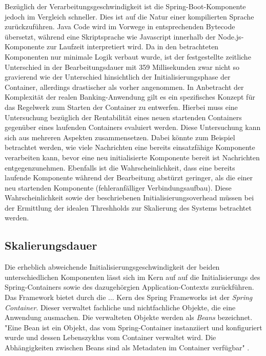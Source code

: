 Bezüglich der Verarbeitungsgeschwindigkeit ist die Spring-Boot-Komponente jedoch im Vergleich schneller. Dies ist auf die Natur einer kompilierten Sprache zurückzuführen. Java Code wird im Vorwege in entsprechenden Bytecode übersetzt, während eine Skriptsprache wie Javascript innerhalb der Node.js-Komponente zur Laufzeit interpretiert wird. Da in den betrachteten Komponenten nur minimale Logik verbaut wurde, ist der festgestellte zeitliche Unterschied in der Bearbeitungsdauer mit 359  Millisekunden zwar nicht so gravierend wie der Unterschied hinsichtlich der Initialisierungsphase der Container, allerdings drastischer als vorher angenommen. In Anbetracht der Komplexität der realen Banking-Anwendung gilt es ein spezifisches Konzept für das Regelwerk zum Starten der Container zu entwerfen. Hierbei muss eine Untersuchung bezüglich der Rentabilität eines neuen startenden Containers gegenüber eines laufenden Containers evaluiert werden. Diese Untersuchung kann sich aus mehreren Aspekten zusammensetzen. Dabei könnte zum Beispiel betrachtet werden, wie viele Nachrichten eine bereits einsatzfähige Komponente verarbeiten kann, bevor eine neu initialisierte Komponente bereit ist Nachrichten entgegenzunehmen. Ebenfalls ist die Wahrscheinlichkeit, dass eine bereits laufende Komponente während der Bearbeitung abstürzt geringer, als die einer neu startenden Komponente (fehleranfälliger Verbindungsaufbau). Diese Wahrscheinlichkeit sowie der beschriebenen Initialisierungsoverhead müssen bei der Ermittlung der idealen Threshholds zur Skalierung des Systems betrachtet werden. 


\subsection{Skalierungsdauer}
\label{ss:skalierungsdauer}
Die erheblich abweichende Initialisierungsgeschwindigkeit der beiden unterschiedlichen Komponenten lässt sich im Kern auf auf die Initialisierungs des Spring-Containers sowie des dazugehörgien Application-Contexts zurückführen. Das Framework bietet durch die ... 
Kern des Spring Frameworks ist der \emph{Spring Container}. Dieser verwaltet fachliche und nichtfachliche Objekte, die eine Anwendung ausmachen. Die verwalteten Objekte werden als \emph{Beans} bezeichnet. "Eine Bean ist ein Objekt, das vom Spring-Container instanziiert und konfiguriert wurde und dessen Lebenszyklus vom Container verwaltet wird. Die Abhängigkeiten zwischen Beans sind als Metadaten im Container verfügbar" \cite[Kapitel~3.1.1]{simons-spring}. 

